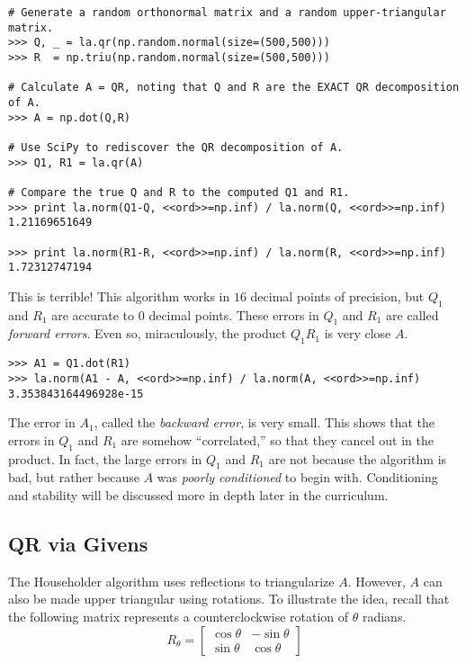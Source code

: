 \begin{lstlisting}
# Generate a random orthonormal matrix and a random upper-triangular matrix.
>>> Q, _ = la.qr(np.random.normal(size=(500,500)))
>>> R  = np.triu(np.random.normal(size=(500,500)))

# Calculate A = QR, noting that Q and R are the EXACT QR decomposition of A.
>>> A = np.dot(Q,R)

# Use SciPy to rediscover the QR decomposition of A.
>>> Q1, R1 = la.qr(A)

# Compare the true Q and R to the computed Q1 and R1.
>>> print la.norm(Q1-Q, <<ord>>=np.inf) / la.norm(Q, <<ord>>=np.inf)
1.21169651649

>>> print la.norm(R1-R, <<ord>>=np.inf) / la.norm(R, <<ord>>=np.inf)
1.72312747194
\end{lstlisting}

This is terrible!
This algorithm works in $16$ decimal points of precision, but $Q_1$ and $R_1$ are accurate to $0$ decimal points.
These errors in $Q_1$ and $R_1$ are called \emph{forward errors}.
Even so, miraculously, the product $Q_1 R_1$ is very close $A$.

\begin{lstlisting}
>>> A1 = Q1.dot(R1)
>>> la.norm(A1 - A, <<ord>>=np.inf) / la.norm(A, <<ord>>=np.inf)
3.353843164496928e-15
\end{lstlisting}

The error in $A_1$, called the \emph{backward error}, is very small.
This shows that the errors in $Q_1$ and $R_1$ are somehow ``correlated,'' so that they cancel out in the product.
In fact, the large errors in $Q_1$ and $R_1$ are not because the algorithm is bad, but rather because $A$ was \emph{poorly conditioned} to begin with.
Conditioning and stability will be discussed more in depth later in the curriculum.

\subsection*{QR via Givens} %

The Householder algorithm uses reflections to triangularize $A$.
However, $A$ can also be made upper triangular using rotations.
To illustrate the idea, recall that the following matrix represents a counterclockwise rotation of $\theta$ radians.
\[
R_\theta =
\left[\begin{array}{cc}
\cos\theta & -\sin\theta \\
\sin\theta &  \cos\theta
\end{array}\right]
\]

